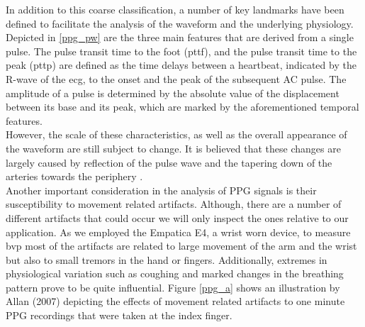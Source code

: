 In addition to this coarse classification, a number of key landmarks have been defined to facilitate the analysis of the waveform and the underlying physiology. Depicted in \ref{ppg_pw} are the three main features that are derived from a single pulse. The pulse transit time to the foot (\gls{pttf}), and the pulse transit time to the peak (\gls{pttp}) are defined as the time delays between a heartbeat, indicated by the R-wave of the \gls{ecg}, to the onset and the peak of the subsequent AC pulse.
The amplitude of a pulse is determined by the absolute value of the displacement between its base and its peak, which are marked by the aforementioned temporal features.\\
However, the scale of these characteristics, as well as the overall appearance of the waveform are still subject to change. It is believed that these changes are largely caused by reflection of the pulse wave and the tapering down of the arteries towards the periphery \cite{Allan2007}.\\
Another important consideration in the analysis of PPG signals is their susceptibility to movement related artifacts. Although, there are a number of different artifacts that could occur we will only inspect the ones relative to our application. As we employed the Empatica E4, a wrist worn device, to measure \gls{bvp} most of the artifacts are related to large movement of the arm and the wrist but also to small tremors in the hand or fingers. Additionally, extremes in physiological variation such as coughing and marked changes in the breathing pattern prove to be quite influential. Figure \ref{ppg_a} shows an illustration by Allan (2007) depicting the effects of movement related artifacts to one minute PPG recordings that were taken at the index finger.\\

